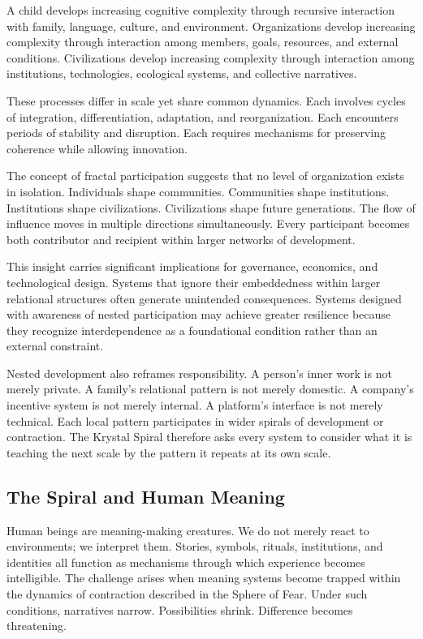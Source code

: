 \documentclass[12pt]{article}
\begin{document}
A child develops increasing cognitive complexity through recursive interaction with family, language, culture, and environment. Organizations develop increasing complexity through interaction among members, goals, resources, and external conditions. Civilizations develop increasing complexity through interaction among institutions, technologies, ecological systems, and collective narratives.

These processes differ in scale yet share common dynamics. Each involves cycles of integration, differentiation, adaptation, and reorganization. Each encounters periods of stability and disruption. Each requires mechanisms for preserving coherence while allowing innovation.

The concept of fractal participation suggests that no level of organization exists in isolation. Individuals shape communities. Communities shape institutions. Institutions shape civilizations. Civilizations shape future generations. The flow of influence moves in multiple directions simultaneously. Every participant becomes both contributor and recipient within larger networks of development.

This insight carries significant implications for governance, economics, and technological design. Systems that ignore their embeddedness within larger relational structures often generate unintended consequences. Systems designed with awareness of nested participation may achieve greater resilience because they recognize interdependence as a foundational condition rather than an external constraint.

Nested development also reframes responsibility. A person's inner work is not merely private. A family's relational pattern is not merely domestic. A company's incentive system is not merely internal. A platform's interface is not merely technical. Each local pattern participates in wider spirals of development or contraction. The Krystal Spiral therefore asks every system to consider what it is teaching the next scale by the pattern it repeats at its own scale.

\subsection{The Spiral and Human Meaning}

Human beings are meaning-making creatures. We do not merely react to environments; we interpret them. Stories, symbols, rituals, institutions, and identities all function as mechanisms through which experience becomes intelligible. The challenge arises when meaning systems become trapped within the dynamics of contraction described in the Sphere of Fear. Under such conditions, narratives narrow. Possibilities shrink. Difference becomes threatening.
\end{document}
